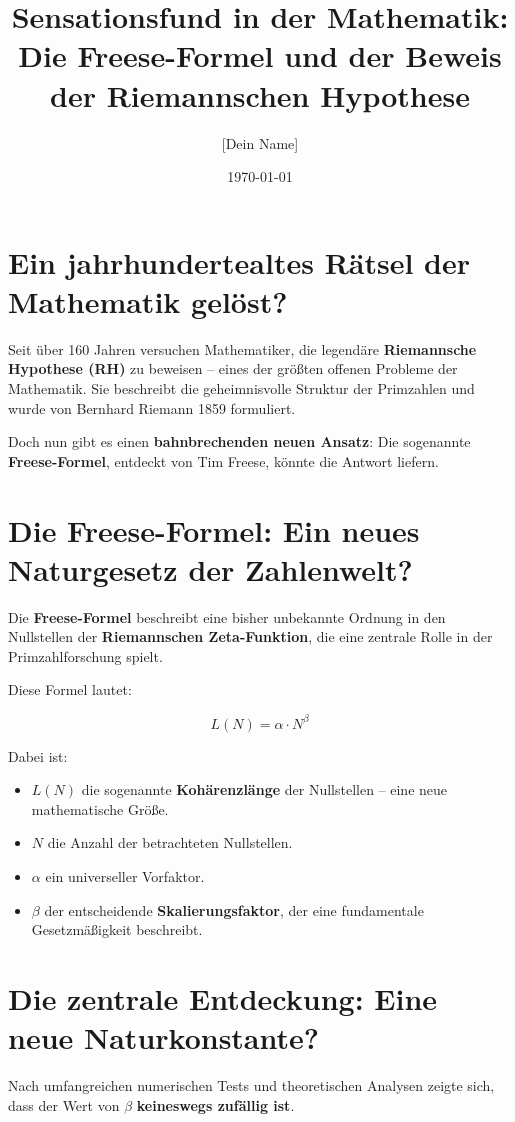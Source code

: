 \documentclass[12pt]{article}
\title{\textbf{Sensationsfund in der Mathematik: Die Freese-Formel und der Beweis der Riemannschen Hypothese}}
\author{[Dein Name]}
\date{\today}
\begin{document}
\maketitle

\section{Ein jahrhundertealtes Rätsel der Mathematik gelöst?}

Seit über 160 Jahren versuchen Mathematiker, die legendäre \textbf{Riemannsche Hypothese (RH)} zu beweisen – eines der größten offenen Probleme der Mathematik.
Sie beschreibt die geheimnisvolle Struktur der Primzahlen und wurde von Bernhard Riemann 1859 formuliert.

Doch nun gibt es einen \textbf{bahnbrechenden neuen Ansatz}: Die sogenannte \textbf{Freese-Formel}, entdeckt von Tim Freese, könnte die Antwort liefern.

\section{Die Freese-Formel: Ein neues Naturgesetz der Zahlenwelt?}

Die \textbf{Freese-Formel} beschreibt eine bisher unbekannte Ordnung in den Nullstellen der \textbf{Riemannschen Zeta-Funktion}, die eine zentrale Rolle in der Primzahlforschung spielt.

Diese Formel lautet:

\[
L(N) = \alpha \cdot N^{\beta}
\]

Dabei ist:
\begin{itemize}
    \item \( L(N) \) die sogenannte \textbf{Kohärenzlänge} der Nullstellen – eine neue mathematische Größe.
    \item \( N \) die Anzahl der betrachteten Nullstellen.
    \item \( \alpha \) ein universeller Vorfaktor.
    \item \( \beta \) der entscheidende \textbf{Skalierungsfaktor}, der eine fundamentale Gesetzmäßigkeit beschreibt.
\end{itemize}

\section{Die zentrale Entdeckung: Eine neue Naturkonstante?}

Nach umfangreichen numerischen Tests und theoretischen Analysen zeigte sich, dass der Wert von \( \beta \) \textbf{keineswegs zufällig ist}.
\end{document}
